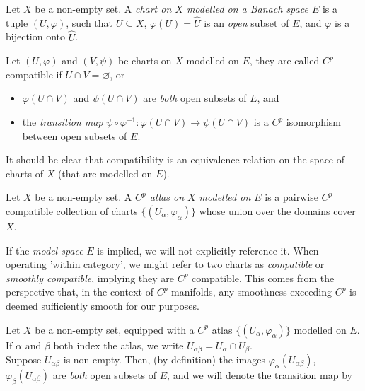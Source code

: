 \documentclass[../main-v2-manifolds.tex]{subfiles}
\begin{document}
\begin{definition}[Chart]\label{def:chart}
    Let $X$ be a non-empty set. A \emph{chart on $X$ modelled on a Banach space $E$} is a tuple $(U,\varphi)$, such that $U\subseteq X$,  $\varphi(U)=\hat{U}$ is an \emph{open} subset of $E$, and $\varphi$ is a bijection onto $\hat{U}$.
\end{definition}
\begin{definition}[Compatibility]\label{def:compatibility}
    Let $(U,\varphi)$ and $(V,\psi)$ be charts on $X$ modelled on $E$, they are called $C^p$ compatible if $U\cap V=\varnothing$, or 
    \begin{itemize}
        \item $\varphi(U\cap V)$ and $\psi(U\cap V)$ are \emph{both} open subsets of $E$, and
        \item the \emph{transition map} $\psi\circ\varphi^{-1}: \varphi(U\cap V)\to \psi(U\cap V)$ is a $C^p$ isomorphism between open subsets of $E$.
    \end{itemize}
    It should be clear that compatibility is an equivalence relation on the space of charts of $X$ (that are modelled on $E$). 
\end{definition}
\begin{definition}[Atlas]\label{def:atlas}
    Let $X$ be a non-empty set. A \emph{$C^p$ atlas on $X$ modelled on $E$} is a pairwise $C^p$ compatible collection of charts $\{(U_\alpha,\varphi_\alpha)\}$ whose union over the domains cover $X$.
\end{definition}
\begin{remark}[Omissions]
    If the \emph{model space} \( E \) is implied, we will not explicitly reference it. When operating 'within category', we might refer to two charts as \emph{compatible} or \emph{smoothly compatible}, implying they are $C^p$ compatible. This comes from the perspective that, in the context of $C^p$ manifolds, any smoothness exceeding $C^p$ is deemed sufficiently smooth for our purposes.
\end{remark}

Let $X$ be a non-empty set, equipped with a $C^p$ atlas $\{(U_\alpha,\varphi_\alpha)\}$ modelled on $E$. If $\alpha$ and $\beta$ both index the atlas, we write  $U_{\alpha\beta} = U_{\alpha}\cap U_{\beta}$.\\

Suppose $U_{\alpha\beta}$ is non-empty. Then, (by definition) the images $\varphi_{\alpha}(U_{\alpha\beta})$, $\varphi_{\beta}(U_{\alpha\beta})$ are \emph{both} open subsets of $E$, and we will denote the transition map by
\end{document}
